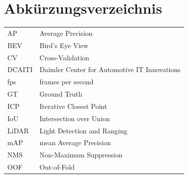 \section*{Abkürzungsverzeichnis}

{\renewcommand{\arraystretch}{1.8}
\begin{tabular}{@{}ll@{}}
AP      & Average Precision \\[0.3em]
BEV     & Bird's Eye View \\[0.3em]
CV      & Cross-Validation \\[0.3em]
DCAITI  & Daimler Center for Automotive IT Innovations \\[0.3em]
fps     & frames per second \\[0.3em]
GT      & Ground Truth \\[0.3em]
ICP     & Iterative Closest Point \\[0.3em]
IoU     & Intersection over Union \\[0.3em]
LiDAR   & Light Detection and Ranging \\[0.3em]
mAP     & mean Average Precision \\[0.3em]
NMS     & Non-Maximum Suppression \\[0.3em]
OOF     & Out-of-Fold
\end{tabular}
}
